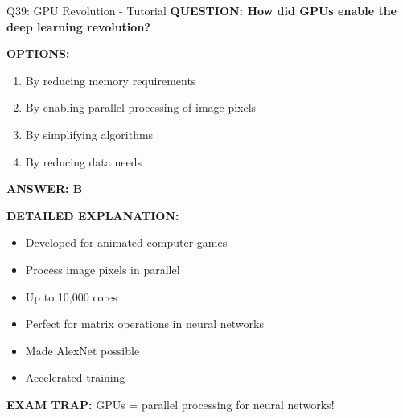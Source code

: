 \documentclass[8pt]{beamer}
\begin{document}
	\begin{frame}{Q39: GPU Revolution - Tutorial}
		\fontsize{6.5}{7.5}\selectfont
		\textbf{QUESTION: How did GPUs enable the deep learning revolution?}
		
		\vspace{0.1cm}
		\textbf{OPTIONS:}
		\begin{enumerate}
			\item By reducing memory requirements
			\item By enabling parallel processing of image pixels
			\item By simplifying algorithms
			\item By reducing data needs
		\end{enumerate}
		
		\vspace{0.1cm}
		\textcolor{myblue}{\textbf{ANSWER: B}}
		
		\vspace{0.1cm}
		\textbf{DETAILED EXPLANATION:}
		\begin{itemize}
			\item Developed for animated computer games
			\item Process image pixels in parallel
			\item Up to 10,000 cores
			\item Perfect for matrix operations in neural networks
			\item Made AlexNet possible
			\item Accelerated training
		\end{itemize}
		
		\vspace{0.1cm}
		\textcolor{myred}{\textbf{EXAM TRAP:}} GPUs = \textcolor{myblue}{parallel processing for neural networks}!
	\end{frame}
	
\end{document}
